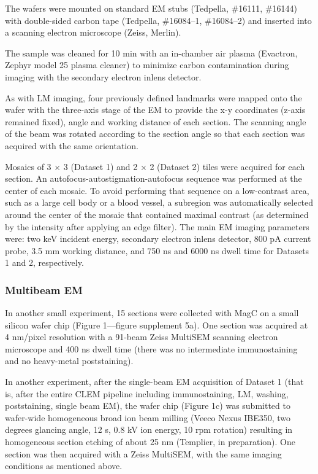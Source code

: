 \documentclass{article}
\begin{document}
The wafers were mounted on standard EM stubs (Tedpella, \#16111, \#16144) with double-sided carbon tape (Tedpella, \#16084–1, \#16084–2) and inserted into a scanning electron microscope (Zeiss, Merlin).

The sample was cleaned for 10 min with an in-chamber air plasma (Evactron, Zephyr model 25 plasma cleaner) to minimize carbon contamination during imaging with the secondary electron inlens detector.

As with LM imaging, four previously defined landmarks were mapped onto the wafer with the three-axis stage of the EM to provide the x-y coordinates (z-axis remained fixed), angle and working distance of each section. The scanning angle of the beam was rotated according to the section angle so that each section was acquired with the same orientation.

Mosaics of 3 × 3 (Dataset 1) and 2 × 2 (Dataset 2) tiles were acquired for each section. An autofocus-autostigmation-autofocus sequence was performed at the center of each mosaic. To avoid performing that sequence on a low-contrast area, such as a large cell body or a blood vessel, a subregion was automatically selected around the center of the mosaic that contained maximal contrast (as determined by the intensity after applying an edge filter). The main EM imaging parameters were: two keV incident energy, secondary electron inlens detector, 800 pA current probe, 3.5 mm working distance, and 750 ns and 6000 ns dwell time for Datasets 1 and 2, respectively.

\subsubsection*{Multibeam EM}

In another small experiment, 15 sections were collected with MagC on a small silicon wafer chip (Figure 1---figure supplement 5a). One section was acquired at 4 nm/pixel resolution with a 91-beam Zeiss MultiSEM scanning electron microscope and 400 ns dwell time (there was no intermediate immunostaining and no heavy-metal poststaining).

In another experiment, after the single-beam EM acquisition of Dataset 1 (that is, after the entire CLEM pipeline including immunostaining, LM, washing, poststaining, single beam EM), the wafer chip (Figure 1c) was submitted to wafer-wide homogeneous broad ion beam milling (Veeco Nexus IBE350, two degrees glancing angle, 12 s, 0.8 kV ion energy, 10 rpm rotation) resulting in homogeneous section etching of about 25 nm (Templier, in preparation). One section was then acquired with a Zeiss MultiSEM, with the same imaging conditions as mentioned above.
\end{document}
